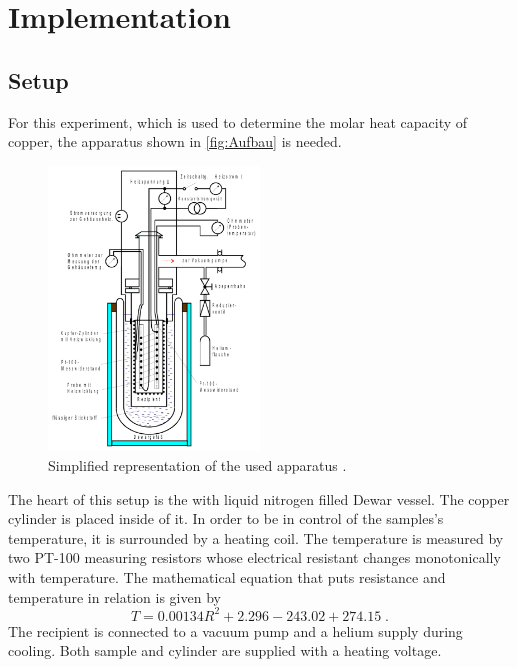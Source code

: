 \section{Implementation}
\label{sec:Aufbau}

\subsection{Setup}
For this experiment, which is used to determine the molar heat capacity of copper, the apparatus shown in \autoref{fig:Aufbau} is needed.
\begin{figure}
    \centering
        \includegraphics[width=0.5\textwidth]{Aufbau.pdf}
        \caption{Simplified representation of the used apparatus \cite{ap47}.}
        \label{fig:Aufbau}
\end{figure}
The heart of this setup is the with liquid nitrogen filled Dewar vessel. The copper cylinder is placed inside of it. In order to be in control of the samples's temperature, it is surrounded by a heating coil.
The temperature is measured by two PT-100 measuring resistors whose electrical resistant changes monotonically with temperature.
The mathematical equation that puts resistance and temperature in relation is given by 
\begin{equation*}
    T=0.00134 R^2+2.296-243.02+274.15\; . 
\end{equation*}
The recipient is connected to a vacuum pump and a helium supply during cooling. Both sample and cylinder are supplied with a heating voltage.


